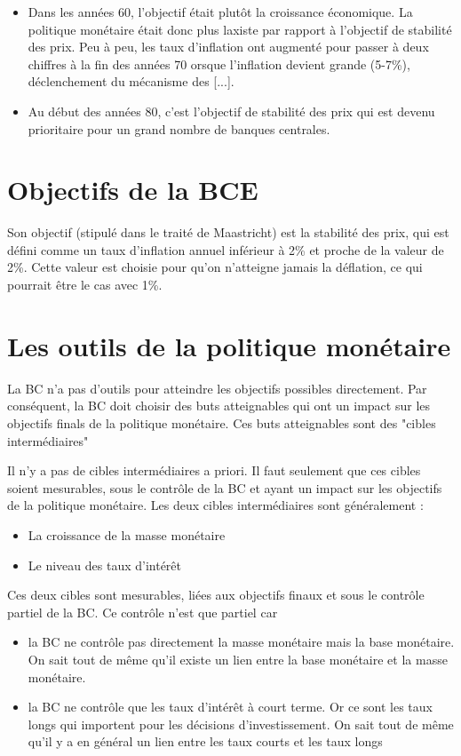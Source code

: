 \begin{itemize}
	\item Dans les années 60, l'objectif était plutôt la croissance économique. La politique monétaire était donc plus laxiste par rapport à l'objectif de stabilité des prix. Peu à peu, les taux d'inflation ont augmenté pour passer à deux chiffres à la fin des années 70 orsque l'inflation devient grande (5-7\%), déclenchement du mécanisme des [...].
	\item Au début des années 80, c'est l'objectif de stabilité des prix qui est devenu prioritaire pour un grand nombre de banques centrales.
\end{itemize}

\section{Objectifs de la BCE}

Son objectif (stipulé dans le traité de Maastricht) est la stabilité des prix, qui est défini comme un taux d'inflation annuel inférieur à 2\% et proche de la valeur de 2\%. Cette valeur est choisie pour qu'on n'atteigne jamais la déflation, ce qui pourrait être le cas avec 1\%.

\section{Les outils de la politique monétaire}

La BC n'a pas d'outils pour atteindre les objectifs possibles directement. Par conséquent, la BC doit choisir des buts atteignables qui ont un impact sur les objectifs finals de la politique monétaire. 
Ces buts atteignables sont des "cibles intermédiaires"

Il n'y a pas de cibles intermédiaires a priori. Il faut seulement que ces cibles soient mesurables, sous le contrôle de la BC et ayant un impact sur les objectifs de la politique monétaire. Les deux cibles intermédiaires sont généralement :

\begin{itemize}
	\item La croissance de la masse monétaire
	\item Le niveau des taux d'intérêt
\end{itemize}

Ces deux cibles sont mesurables, liées aux objectifs finaux et sous le contrôle partiel de la BC. Ce contrôle n'est que partiel car
\begin{itemize}
	\item la BC ne contrôle pas directement la masse monétaire mais la base monétaire. On sait tout de même qu'il existe un lien entre la base monétaire et la masse monétaire.
	\item la BC ne contrôle que les taux d'intérêt à court terme. Or ce sont les taux longs qui importent pour les décisions d'investissement. On sait tout de même qu'il y a en général un lien entre les taux courts et les taux longs
\end{itemize}

